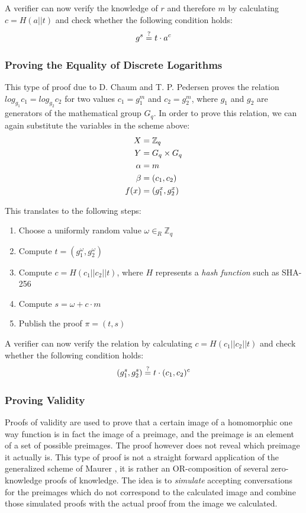 \documentclass[numbers=noenddot, abstract=on, a4paper, headsepline,
footsepline, oneside, openright, draft=off, listof=leveldown]{scrreprt}
\begin{document}
A verifier can now verify the knowledge of $r$ and therefore $m$ by calculating
$c=H(a||t)$ and check whether the following condition holds:
\begin{equation}
	g^s \stackrel{?}{=} t \cdot a^c \notag
\end{equation}

\subsubsection{Proving the Equality of Discrete Logarithms}
\label{sec:proofeqdlog}
This type of proof due to D. Chaum and T. P. Pedersen \cite{CP93}
 proves the relation $log_{g_1} c_1 = log_{g_2} c_2 $ for two values $c_1 =
g_1^m$ and $c_2 = g_2^m$, where $g_1$ and $g_2$ are generators of the
mathematical group $G_q$. In order to prove this relation, we can again
substitute the variables in the scheme above:
\begin{align}
  X &= \mathbb{Z}_q \notag \\
  Y &= G_q \times G_q \notag \\
  \alpha &=m \notag \\
  \beta &=(c_1, c_2) \notag \\
  f(x) &= (g_1^x, g_2^x) \notag
\end{align} 

This translates to the following steps:

\begin{enumerate}
  \item Choose a uniformly random value $\omega \in_R \mathbb{Z}_q$
  \item Compute $t=(g_1^\omega, g_2^\omega)$
  \item Compute $c=H(c_1||c_2||t)$, where $H$ represents a
  \emph{hash function} such as SHA-256
  \item Compute $s=\omega + c \cdot m$
  \item Publish the proof $\pi = (t,s)$
\end{enumerate}

A verifier can now verify the relation by calculating
$c=H(c_1||c_2||t)$ and check whether the following condition holds:
\begin{equation}
	(g_1^s, g_2^s) \stackrel{?}{=} t \cdot (c_1, c_2)^c \notag
\end{equation}


\subsubsection{Proving Validity}
\label{sec:proofofvalidity}
Proofs of validity are used to prove that a certain image of a homomorphic one
way function is in fact the image of a preimage, and the preimage is an element
of a set of possible preimages. The proof however does not reveal which preimage
it actually is. This type of proof is not a straight forward application of the
generalized scheme of Maurer \cite{Maurer09}, it is rather an OR-composition of
several zero-knowledge proofs of knowledge. The idea is to \emph{simulate}
accepting conversations for the preimages which do not correspond to the
calculated image and combine those simulated proofs with the actual proof from
the image we calculated.
\end{document}
